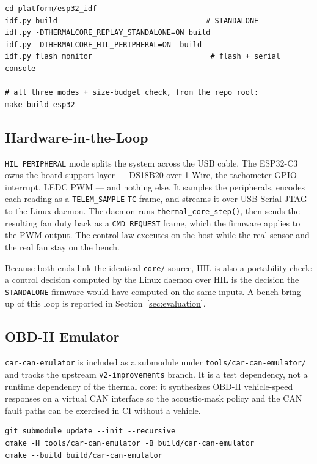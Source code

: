 \begin{lstlisting}[caption={Building and flashing the firmware}]
cd platform/esp32_idf
idf.py build                                  # STANDALONE
idf.py -DTHERMALCORE_REPLAY_STANDALONE=ON build
idf.py -DTHERMALCORE_HIL_PERIPHERAL=ON  build
idf.py flash monitor                           # flash + serial console

# all three modes + size-budget check, from the repo root:
make build-esp32
\end{lstlisting}

\subsection{Hardware-in-the-Loop}

\texttt{HIL\_PERIPHERAL} mode splits the system across the USB cable. The ESP32-C3 owns the board-support layer --- DS18B20 over 1-Wire, the tachometer GPIO interrupt, LEDC PWM --- and nothing else. It samples the peripherals, encodes each reading as a \texttt{TELEM\_SAMPLE} \texttt{TC} frame, and streams it over USB-Serial-JTAG to the Linux daemon. The daemon runs \texttt{thermal\_core\_step()}, then sends the resulting fan duty back as a \texttt{CMD\_REQUEST} frame, which the firmware applies to the PWM output. The control law executes on the host while the real sensor and the real fan stay on the bench.

Because both ends link the identical \texttt{core/} source, HIL is also a portability check: a control decision computed by the Linux daemon over HIL is the decision the \texttt{STANDALONE} firmware would have computed on the same inputs. A bench bring-up of this loop is reported in Section~\ref{sec:evaluation}.

\subsection{OBD-II Emulator}

\texttt{car-can-emulator} is included as a submodule under \texttt{tools/car-can-emulator/} and tracks the upstream \texttt{v2-improvements} branch. It is a test dependency, not a runtime dependency of the thermal core: it synthesizes OBD-II vehicle-speed responses on a virtual CAN interface so the acoustic-mask policy and the CAN fault paths can be exercised in CI without a vehicle.

\begin{lstlisting}[caption={Emulator build}]
git submodule update --init --recursive
cmake -H tools/car-can-emulator -B build/car-can-emulator
cmake --build build/car-can-emulator
\end{lstlisting}

